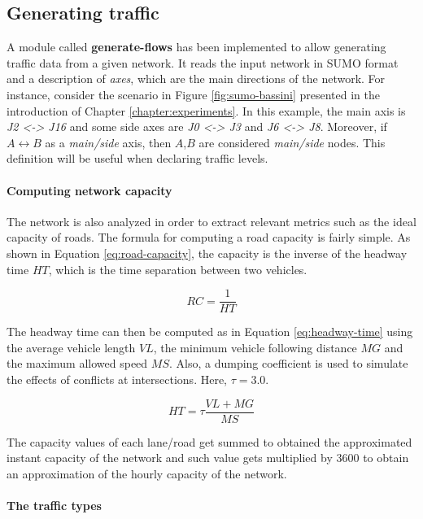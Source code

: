 \subsection{Generating traffic}

A module called \textbf{generate-flows} has been implemented to allow generating traffic data from a given network.
It reads the input network in SUMO format and a description of \textit{axes}, which are the main directions of the network.
For instance, consider the scenario in Figure \ref{fig:sumo-bassini} presented in the introduction of Chapter \ref{chapter:experiments}.
In this example, the main axis is \textit{J2 <-> J16} and some side axes are \textit{J0 <-> J3} and \textit{J6 <-> J8}.
Moreover, if $A \leftrightarrow B$ as a \textit{main/side} axis, then $A$,$B$ are considered \textit{main/side} nodes.
This definition will be useful when declaring traffic levels.

\paragraph{Computing network capacity}

The network is also analyzed in order to extract relevant metrics such as the ideal capacity of roads.
The formula for computing a road capacity is fairly simple. As shown in Equation \ref{eq:road-capacity}, the capacity is the inverse of the headway time $HT$, which is the time separation between two vehicles.

\begin{equation} \label{eq:road-capacity}
  RC = \frac {1} {HT}
\end{equation}

The headway time can then be computed as in Equation \ref{eq:headway-time} using the average vehicle length $VL$, the minimum vehicle following distance $MG$ and the maximum allowed speed $MS$.
Also, a dumping coefficient is used to simulate the effects of conflicts at intersections. Here, $\tau = 3.0$.

\begin{equation} \label{eq:headway-time}
  HT = \tau \frac {VL + MG} {MS}
\end{equation}

The capacity values of each lane/road get summed to obtained the approximated instant capacity of the network and such value gets multiplied by $3600$ to obtain an approximation of the hourly capacity of the network.

\paragraph{The traffic types}

